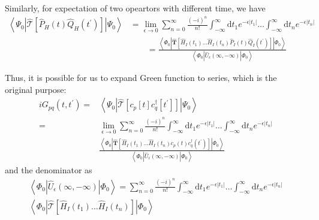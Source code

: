 Similarly, for expectation of two opeartors with different time, we have
\begin{equation}
\begin{aligned}
	\left\langle\Psi_{0}\left|\hat{\mathcal{T}}\left[\hat{P}_{H}(t) \hat{Q}_{H}\left(t^{\prime}\right)\right]\right| \Psi_{0}\right\rangle
	&=\lim _{\epsilon \rightarrow 0} \sum_{n=0}^{\infty} \frac{(-i)^{n}}{n !} \int_{-\infty}^{\infty} \mathrm{d} t_{1} e^{-\epsilon\left|t_{1}\right|} \ldots \int_{-\infty}^{\infty} \mathrm{d} t_{n} e^{-\epsilon\left|t_{n}\right|}
	\\
	&\qquad =\frac{\left\langle\Phi_{0}\left|
	\hat{\boldsymbol{T}}\left[\hat{H}_{I}\left(t_{1}\right) \ldots \hat{H}_{I}\left(t_{n}\right) \hat{P}_{I}(t) \hat{Q}_{I}\left(t^{\prime}\right)\right]\right|
	\Phi_{0}\right\rangle}
	{\left\langle\Phi_{0}\left|\hat{U}_{\epsilon}(\infty,-\infty)\right| \Phi_{0}\right\rangle}
\end{aligned}
\end{equation}

Thus, it is possible for us to expand Green function to series, which is the original purpose:
\begin{equation} \label{greenexp}
\begin{aligned}
	i G_{p q}\left(t, t^{\prime}\right)
	=&\left\langle\Psi_{0}\left|
	\hat{\mathcal{T}}\left[c_{p}[t] c_{q}^{\dagger}\left[t^{\prime}\right]\right]\right|
	\Psi_{0}\right\rangle
	\\
	=& \lim _{\epsilon \rightarrow 0} \sum_{n=0}^{\infty} \frac{(-i)^{n}}{n !} 
	\int_{-\infty}^{\infty} \mathrm{d} t_{1} e^{-\epsilon\left|t_{1}\right|} \ldots \int_{-\infty}^{\infty} \mathrm{d} t_{n} e^{-\epsilon\left|t_{n}\right|}
	\\
	& \frac{\left\langle\Phi_{0}\left|
	\hat{\boldsymbol{T}}\left[\hat{H}_{I}\left(t_{1}\right) \ldots \hat{H}_{I}\left(t_{n}\right) c_{p}(t) c_{q}^{\dagger}\left(t^{\prime}\right)\right]\right|
	\Phi_{0}\right\rangle}
	{\left\langle\Phi_{0}\left|
	\hat{U}_{\epsilon}(\infty,-\infty)\right|
	\Phi_{0}\right\rangle}
\end{aligned}
\end{equation}
and the denominator as
\begin{equation}
\begin{aligned}\left\langle\Phi_{0}\left|\hat{U}_{\epsilon}(\infty,-\infty)\right| \Phi_{0}\right\rangle=\sum_{n=0}^{\infty} \frac{(-i)^{n}}{n !} \int_{-\infty}^{\infty} \mathrm{d} t_{1} e^{-\epsilon\left|t_{1}\right|} \ldots \int_{-\infty}^{\infty} \mathrm{d} t_{n} e^{-\epsilon\left|t_{n}\right|} \\\left\langle\Phi_{0}\left|\hat{\mathcal{T}}\left[\hat{H}_{I}\left(t_{1}\right) \ldots \hat{H}_{I}\left(t_{n}\right)\right]\right| \Phi_{0}\right\rangle \end{aligned}
\end{equation}

